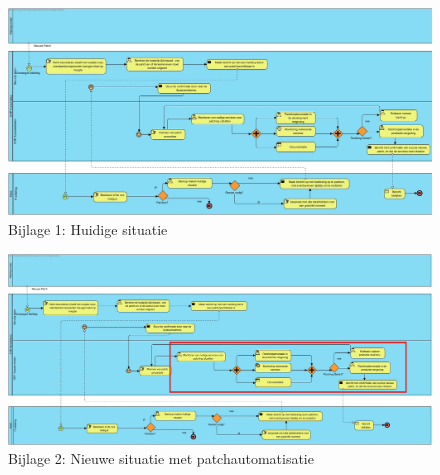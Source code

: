 \documentclass[dutch,dit,thesis]{hogentreport}
\begin{document}
\begin{figure}
    \centering
    \includegraphics[height=0.7\textwidth,angle=270]{huidigesituatie.jpg}
    \caption{Bijlage 1: Huidige situatie}
    \label{bijlage:1}
\end{figure}

\begin{figure}[htbp]
    \centering
    \includegraphics[height=0.7\textwidth,angle=270]{huidigesituatie2.png}
    \caption{Bijlage 2: Nieuwe situatie met patchautomatisatie}
     \label{bijlage:2}
\end{figure}



\backmatter{}

\setlength\bibitemsep{2pt} %
\printbibliography[heading=bibintoc]
\end{document}
